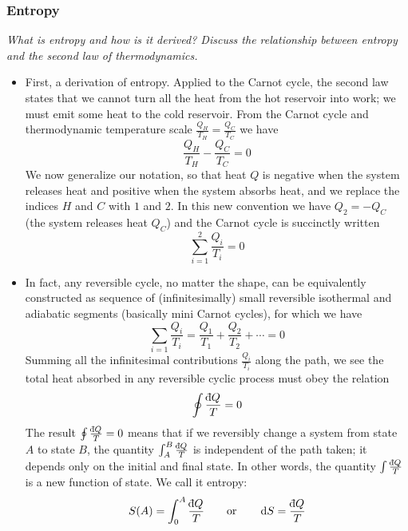 \documentclass[11pt, a4paper]{article}
\newcommand{\eqtext}[1]{\qquad \text{#1} \qquad}
\newcommand{\diff}{\mathop{}\!\mathrm{d}} %
\newcommand{\dbar}{{\mathchar '26\mkern -11mu \mathrm{d}}} %
\begin{document}
\subsubsection{Entropy}
\textit{What is entropy and how is it derived? Discuss the relationship between entropy and the second law of thermodynamics.}
\begin{itemize}
	\item First, a derivation of entropy. Applied to the Carnot cycle, the second law states that we cannot turn all the heat from the hot reservoir into work; we must emit some heat to the cold reservoir. From the Carnot cycle and thermodynamic temperature scale $ \frac{Q_{H}}{T_{H}} = \frac{Q_{C}}{T_{C}} $ we have
	\begin{equation*}
		\frac{Q_{H}}{T_{H}} - \frac{Q_{C}}{T_{C}} = 0
	\end{equation*}
	We now generalize our notation, so that heat $ Q $ is negative when the system releases heat and positive when the system absorbs heat, and we replace the indices $ H $ and $ C $ with $ 1 $ and $ 2 $. In this new convention we have $ Q_{2} = - Q_{C} $ (the system releases heat $ Q_{C} $) and the Carnot cycle is succinctly written
	\begin{equation*}
		\sum_{i=1}^{2} \frac{Q_{i}}{T_{i}} = 0
	\end{equation*}
	
	\item In fact, any reversible cycle, no matter the shape, can be equivalently constructed as sequence of (infinitesimally) small reversible isothermal and adiabatic segments (basically mini Carnot cycles), for which we have
	\begin{equation*}
		\sum_{i=1} \frac{Q_{i}}{T_{i}} = \frac{Q_{1}}{T_{1}} + \frac{Q_{2}}{T_{2}} + \cdots = 0
	\end{equation*}
	Summing all the infinitesimal contributions $\frac{Q_{i}}{T_{i}}$ along the path, we see the total heat absorbed in any reversible cyclic process must obey the relation
	\begin{equation*}
		\oint \frac{\dbar Q}{T} = 0
	\end{equation*}
	The result $ \oint \frac{\dbar Q}{T} = 0 $ means that if we reversibly change a system from state $ A $ to state $ B $, the quantity $ \int_{A}^{B} \frac{\dbar Q}{T} $ is independent of the path taken; it depends only on the initial and final state. In other words, the quantity $ \int \frac{\dbar Q}{T} $ is a new function of state. We call it entropy:
	\begin{equation*}
		S(A) = \int_{0}^{A} \frac{\dbar Q}{T} \eqtext{or} \diff S = \frac{\dbar Q}{T}
	\end{equation*}
	

\end{itemize}
\end{document}
